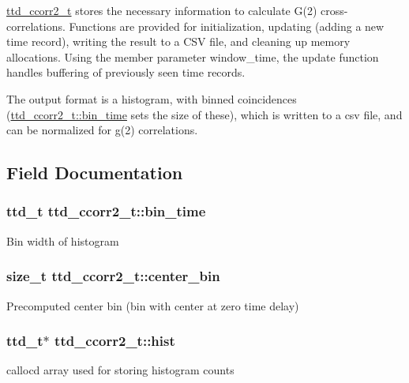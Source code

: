 \hyperlink{structttd__ccorr2__t}{ttd\+\_\+ccorr2\+\_\+t} stores the necessary information to calculate G(2) cross-\/correlations. Functions are provided for initialization, updating (adding a new time record), writing the result to a C\+S\+V file, and cleaning up memory allocations. Using the member parameter {\ttfamily window\+\_\+time}, the update function handles buffering of previously seen time records.

The output format is a histogram, with binned coincidences (\hyperlink{structttd__ccorr2__t_ad92442a4ab2d08d4d15e6b32442a15eb}{ttd\+\_\+ccorr2\+\_\+t\+::bin\+\_\+time} sets the size of these), which is written to a csv file, and can be normalized for g(2) correlations. 

\subsection{Field Documentation}
\hypertarget{structttd__ccorr2__t_ad92442a4ab2d08d4d15e6b32442a15eb}{}
\subsubsection[{bin\+\_\+time}]{\setlength{\rightskip}{0pt plus 5cm}ttd\+\_\+t ttd\+\_\+ccorr2\+\_\+t\+::bin\+\_\+time}\label{structttd__ccorr2__t_ad92442a4ab2d08d4d15e6b32442a15eb}
Bin width of histogram \hypertarget{structttd__ccorr2__t_ade85728d8ba11808be8abbdb876d7d5d}{}
\subsubsection[{center\+\_\+bin}]{\setlength{\rightskip}{0pt plus 5cm}size\+\_\+t ttd\+\_\+ccorr2\+\_\+t\+::center\+\_\+bin}\label{structttd__ccorr2__t_ade85728d8ba11808be8abbdb876d7d5d}
Precomputed center bin (bin with center at zero time delay) \hypertarget{structttd__ccorr2__t_a6670bb2f511309d52c6c0cf9ccc9cf43}{}
\subsubsection[{hist}]{\setlength{\rightskip}{0pt plus 5cm}ttd\+\_\+t$\ast$ ttd\+\_\+ccorr2\+\_\+t\+::hist}\label{structttd__ccorr2__t_a6670bb2f511309d52c6c0cf9ccc9cf43}
calloc\textquotesingle{}d array used for storing histogram counts \hypertarget{structttd__ccorr2__t_a171c849ac19bc37d49c0d6de41d64057}{}
